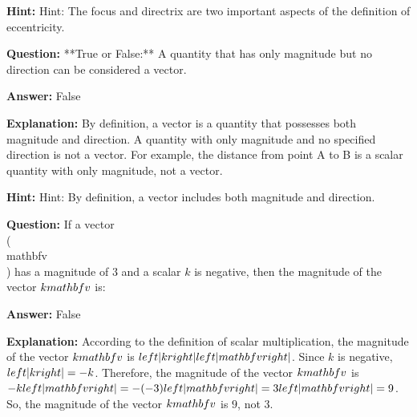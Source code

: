 \documentclass{article}
\begin{document}
                \textbf{Hint:} Hint: The focus and directrix are two important aspects of the definition of eccentricity.
                \vspace{0.5cm} 
        
            
                \textbf {Question:} **True or False:** A quantity that has only magnitude but no direction can be considered a vector.
                
                \textbf{Answer:} False
                
                \textbf{Explanation:} By definition, a vector is a quantity that possesses both magnitude and direction. A quantity with only magnitude and no specified direction is not a vector. For example, the distance from point A to B is a scalar quantity with only magnitude, not a vector.
                
                \textbf{Hint:} Hint: By definition, a vector includes both magnitude and direction.
                \vspace{0.5cm} 
        
            
                \textbf {Question:} If a vector \\(\\mathbf{v}\\) has a magnitude of $3$ and a scalar $k$ is negative, then the magnitude of the vector $k\\mathbf{v}$ is:
                
                \textbf{Answer:} False
                
                \textbf{Explanation:} According to the definition of scalar multiplication, the magnitude of the vector $k\\mathbf{v}$ is $\\left|k\\right|\\left|\\mathbf{v}\\right|$. Since $k$ is negative, $\\left|k\\right| = -k$. Therefore, the magnitude of the vector $k\\mathbf{v}$ is $-k\\left|\\mathbf{v}\\right| = -(-3)\\left|\\mathbf{v}\\right| = 3\\left|\\mathbf{v}\\right| = 9$. So, the magnitude of the vector $k\\mathbf{v}$ is $9$, not $3$.
                
\end{document}
